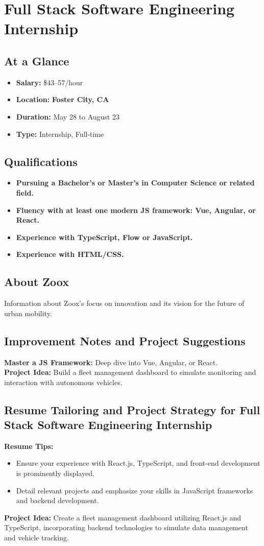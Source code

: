 \section*{Full Stack Software Engineering Internship}
\subsection*{At a Glance}
\begin{itemize}
    \item \textbf{Salary:} \$43–57/hour
    \item \textbf{Location:} \textbf{Foster City, CA}
    \item \textbf{Duration:} May 28 to August 23
    \item \textbf{Type:} Internship, Full-time
\end{itemize}

\subsection*{Qualifications}
\begin{itemize}
    \item \textbf{Pursuing a Bachelor's or Master's in Computer Science or related field.}
    \item \textbf{Fluency with at least one modern JS framework: Vue, Angular, or React.}
    \item \textbf{Experience with TypeScript, Flow or JavaScript.}
    \item \textbf{Experience with HTML/CSS.}
\end{itemize}

\subsection*{About Zoox}
Information about Zoox's focus on innovation and its vision for the future of urban mobility.

\subsection*{Improvement Notes and Project Suggestions}
\textbf{Master a JS Framework:} Deep dive into Vue, Angular, or React.\\
\textbf{Project Idea:} Build a fleet management dashboard to simulate monitoring and interaction with autonomous vehicles.


\subsection*{Resume Tailoring and Project Strategy for Full Stack Software Engineering Internship}
\textbf{Resume Tips:}
\begin{itemize}
    \item Ensure your experience with React.js, TypeScript, and front-end development is prominently displayed.
    \item Detail relevant projects and emphasize your skills in JavaScript frameworks and backend development.
\end{itemize}


\newpage

\textbf{Project Idea:}
Create a fleet management dashboard utilizing React.js and TypeScript, incorporating backend technologies to simulate data management and vehicle tracking.


